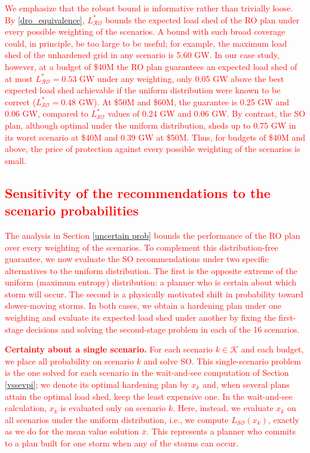 \documentclass[authoryear,preprint,review,12pt]{elsarticle}\usepackage{amssymb}
\begin{document}
\textcolor{red}{We emphasize that the robust bound is informative rather than trivially loose. By \eqref{dro_equivalence}, $L^*_{\mathcal{RO}}$ bounds the expected load shed of the RO plan under every possible weighting of the scenarios. A bound with such broad coverage could, in principle, be too large to be useful; for example, the maximum load shed of the unhardened grid in any scenario is 5.60 GW. In our case study, however, at a budget of \$40M the RO plan guarantees an expected load shed of at most $L^*_{\mathcal{RO}} = 0.53$ GW under any weighting, only 0.05 GW above the best expected load shed achievable if the uniform distribution were known to be correct ($L^*_{\mathcal{SO}} = 0.48$ GW). At \$50M and \$60M, the guarantee is 0.25 GW and 0.06 GW, compared to $L^*_{\mathcal{SO}}$ values of 0.24 GW and 0.06 GW. By contrast, the SO plan, although optimal under the uniform distribution, sheds up to 0.75 GW in its worst scenario at \$40M and 0.39 GW at \$50M. Thus, for budgets of \$40M and above, the price of protection against every possible weighting of the scenarios is small.}

\subsection{\textcolor{red}{Sensitivity of the recommendations to the scenario probabilities}}\label{sensitivity}

\textcolor{red}{The analysis in Section \ref{uncertain prob} bounds the performance of the RO plan over every weighting of the scenarios. To complement this distribution-free guarantee, we now evaluate the SO recommendations under two specific alternatives to the uniform distribution. The first is the opposite extreme of the uniform (maximum entropy) distribution: a planner who is certain about which storm will occur. The second is a physically motivated shift in probability toward slower-moving storms. In both cases, we obtain a hardening plan under one weighting and evaluate its expected load shed under another by fixing the first-stage decisions and solving the second-stage problem in each of the 16 scenarios.}

\textcolor{red}{\textbf{Certainty about a single scenario.} For each scenario $k \in \mathcal{K}$ and each budget, we place all probability on scenario $k$ and solve SO. This single-scenario problem is the one solved for each scenario in the wait-and-see computation of Section \ref{vssevpi}; we denote its optimal hardening plan by $x_k$ and, when several plans attain the optimal load shed, keep the least expensive one. In the wait-and-see calculation, $x_k$ is evaluated only on scenario $k$. Here, instead, we evaluate $x_k$ on all scenarios under the uniform distribution, i.e., we compute $L_{\mathcal{SO}}(x_k)$, exactly as we do for the mean value solution $\bar{x}$. This represents a planner who commits to a plan built for one storm when any of the storms can occur.}
\end{document}
